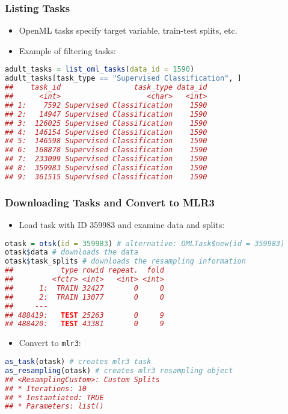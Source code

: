 \documentclass[10pt,compress,t,notes=noshow, xcolor=table]{beamer}
\begin{document}
\begin{frame}[fragile]
\frametitle{Listing Tasks}
\begin{itemize}
  \item OpenML tasks specify target variable, train-test splits, etc.
  \item Example of filtering tasks:
\end{itemize}
\begin{lstlisting}[language=R]
adult_tasks = list_oml_tasks(data_id = 1590)
adult_tasks[task_type == "Supervised Classification", ]
##    task_id                 task_type data_id
##      <int>                    <char>   <int>
## 1:    7592 Supervised Classification    1590
## 2:   14947 Supervised Classification    1590
## 3:  126025 Supervised Classification    1590
## 4:  146154 Supervised Classification    1590
## 5:  146598 Supervised Classification    1590
## 6:  168878 Supervised Classification    1590
## 7:  233099 Supervised Classification    1590
## 8:  359983 Supervised Classification    1590
## 9:  361515 Supervised Classification    1590
\end{lstlisting}
\end{frame}

\begin{frame}[fragile]
\frametitle{Downloading Tasks and Convert to MLR3}
\begin{itemize}
  \item Load task with ID 359983 and examine data and splits:
\end{itemize}
\begin{lstlisting}[language=R]
otask = otsk(id = 359983) # alternative: OMLTask$new(id = 359983)
otask$data # downloads the data
otask$task_splits # downloads the resampling information
##           type rowid repeat.  fold
##         <fctr> <int>   <int> <int>
##      1:  TRAIN 32427       0     0
##      2:  TRAIN 13077       0     0
##     ---                           
## 488419:   TEST 25263       0     9
## 488420:   TEST 43381       0     9
\end{lstlisting}

\begin{itemize}
  \item Convert to \texttt{mlr3}:
\end{itemize}
\begin{lstlisting}[language=R]
as_task(otask) # creates mlr3 task
as_resampling(otask) # creates mlr3 resampling object
## <ResamplingCustom>: Custom Splits
## * Iterations: 10
## * Instantiated: TRUE
## * Parameters: list()
\end{lstlisting}
\end{frame}
\end{document}
